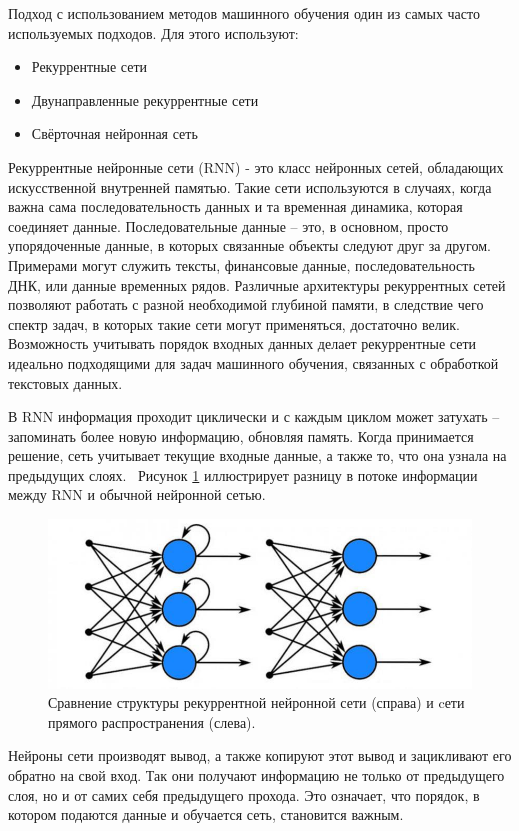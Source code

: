 Подход с использованием методов машинного обучения один из самых часто используемых подходов. 
Для этого используют: 
\begin{itemize}
  \item Рекуррентные сети
  \item Двунаправленные рекуррентные сети
  \item Свёрточная нейронная сеть
\end{itemize}

Рекуррентные нейронные сети (RNN) - это класс нейронных сетей, обладающих искусственной внутренней памятью. 
Такие сети используются в случаях, когда важна сама последовательность данных и та временная динамика, которая соединяет данные. 
Последовательные данные – это, в основном, просто упорядоченные данные, в которых связанные объекты следуют друг за другом. 
Примерами могут служить тексты, финансовые данные, последовательность ДНК, или данные временных рядов. Различные архитектуры 
рекуррентных сетей позволяют работать с разной необходимой глубиной памяти, в следствие чего спектр задач, в которых такие сети 
могут применяться, достаточно велик. Возможность учитывать порядок входных данных делает рекуррентные сети идеально подходящими 
для задач машинного обучения, связанных с обработкой текстовых данных.

В RNN информация проходит циклически и с каждым циклом может затухать – запоминать более новую информацию, обновляя память. 
Когда принимается решение, сеть учитывает текущие входные данные, а также то, что она узнала на предыдущих слоях. \
Рисунок \ref{pic:recur} иллюстрирует разницу в потоке информации между RNN и обычной нейронной сетью.

\begin{figure}[h]
\includegraphics[width=0.75\columnwidth]{./img/recur.jpg}
\centering
\caption{Сравнение структуры рекуррентной нейронной сети (справа) и cети прямого распространения (слева). \cite{recur}}
\label{pic:recur}
\end{figure}

Нейроны сети производят вывод, а также копируют этот вывод и зацикливают его обратно на свой вход.
Так они получают информацию не только от предыдущего слоя, но и от самих себя предыдущего прохода. 
Это означает, что порядок, в котором подаются данные и обучается сеть, становится важным.


